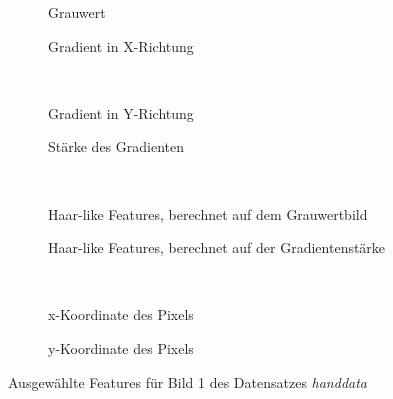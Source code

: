 \documentclass[]{report}
\newlength\figureheight
\newlength\figurewidth
\begin{document}
\begin{enumerate}
						\setlength\figureheight{3.5cm}
						\setlength{}
						\begin{figure}
							\begin{subfigure}{0.45\textwidth}
								\centering
								
								\caption{Grauwert}
								\label{fig:g}
							\end{subfigure}
							\qquad
							\begin{subfigure}{0.45\textwidth}
								\centering
								
								\caption{Gradient in X-Richtung}
								\label{fig:gradx}
							\end{subfigure}	
							\\
							\begin{subfigure}{0.45\textwidth}
								\centering
								
								\caption{Gradient in Y-Richtung}
								\label{fig:grady}
							\end{subfigure}
							\qquad
							\begin{subfigure}{0.45\textwidth}
								\centering
								
								\caption{Stärke des Gradienten}
								\label{fig:m}
							\end{subfigure}	
							\\
								\begin{subfigure}{0.45\textwidth}
									\centering
									
									\caption{Haar-like Features, berechnet auf dem Grauwertbild}
									\label{fig:hgrey}
								\end{subfigure}
								\qquad
								\begin{subfigure}{0.45\textwidth}
									\centering
									
									\caption{Haar-like Features, berechnet auf der Gradientenstärke}
									\label{fig:hgrad}
								\end{subfigure}	
								\\
								\begin{subfigure}{0.45\textwidth}
									\centering
									
									\caption{x-Koordinate des Pixels}
									\label{fig:x}
								\end{subfigure}
								\qquad
								\begin{subfigure}{0.45\textwidth}
									\centering
									
									\caption{y-Koordinate des Pixels}
									\label{fig:y}
								\end{subfigure}	
							\caption{Ausgewählte Features für Bild 1 des Datensatzes \textit{handdata}}
							\label{fig:featurePlot}
						\end{figure}
						

\end{enumerate}
\end{document}
